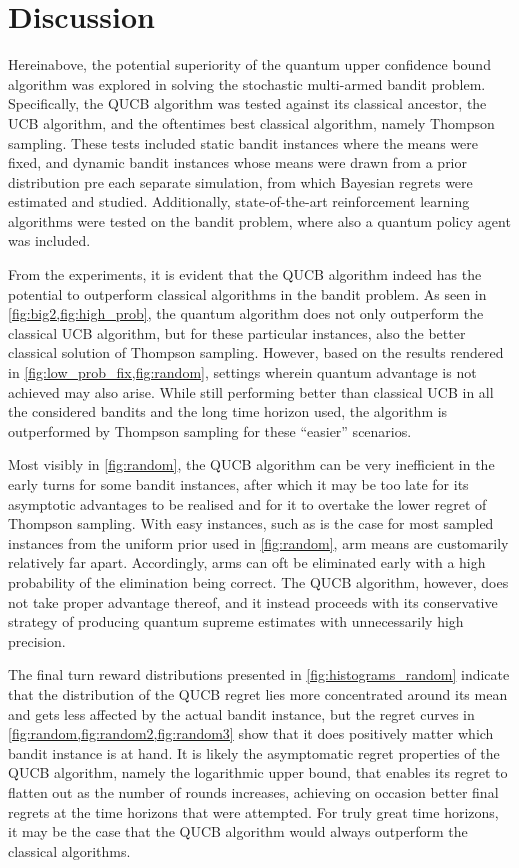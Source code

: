 \section{Discussion}
Hereinabove, the potential superiority of the quantum upper confidence bound algorithm was explored in solving the stochastic multi-armed bandit problem.
Specifically, the QUCB algorithm was tested against its classical ancestor, the UCB algorithm, and the oftentimes best classical algorithm, namely Thompson sampling.
These tests included static bandit instances where the means were fixed, and dynamic bandit instances whose means were drawn from a prior distribution pre each separate simulation, from which Bayesian regrets were estimated and studied.
Additionally, state-of-the-art reinforcement learning algorithms were tested on the bandit problem, where also a quantum policy agent was included.

From the experiments, it is evident that the QUCB algorithm indeed has the potential to outperform classical algorithms in the bandit problem.
As seen in \cref{fig:big2,fig:high_prob}, the quantum algorithm does not only outperform the classical UCB algorithm, but for these particular instances, also the better classical solution of Thompson sampling.
However, based on the results rendered in \cref{fig:low_prob_fix,fig:random}, settings wherein quantum advantage is not achieved may also arise.
While still performing better than classical UCB in all the considered bandits and the long time horizon used, the algorithm is outperformed by Thompson sampling for these \enquote{easier} scenarios.

Most visibly in \cref{fig:random}, the QUCB algorithm can be very inefficient in the early turns for some bandit instances, after which it may be too late for its asymptotic advantages to be realised and for it to overtake the lower regret of Thompson sampling.
With easy instances, such as is the case for most sampled instances from the uniform prior used in \cref{fig:random}, arm means are customarily relatively far apart\footnotemark.
Accordingly, arms can oft be eliminated early with a high probability of the elimination being correct.
The QUCB algorithm, however, does not take proper advantage thereof, and it instead proceeds with its conservative strategy of producing quantum supreme estimates with unnecessarily high precision.


The final turn reward distributions presented in \cref{fig:histograms_random} indicate that the distribution of the QUCB regret lies more concentrated around its mean and gets less affected by the actual bandit instance, but the regret curves in \cref{fig:random,fig:random2,fig:random3} show that it does positively matter which bandit instance is at hand.
It is likely the asymptomatic regret properties of the QUCB algorithm, namely the logarithmic upper bound, that enables its regret to flatten out as the number of rounds increases, achieving on occasion better final regrets at the time horizons that were attempted.
For truly great time horizons, it may be the case that the QUCB algorithm would always outperform the classical algorithms.

